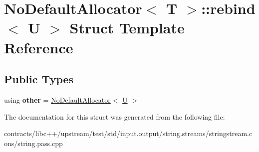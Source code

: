 \hypertarget{struct_no_default_allocator_1_1rebind}{}\section{No\+Default\+Allocator$<$ T $>$\+:\+:rebind$<$ U $>$ Struct Template Reference}
\label{struct_no_default_allocator_1_1rebind}
\subsection*{Public Types}
\begin{DoxyCompactItemize}
\item 
\mbox{\label{struct_no_default_allocator_1_1rebind_aa870ae806507be5bcfce17573c7abf25}} 
using {\bfseries other} = \mbox{\hyperlink{struct_no_default_allocator}{No\+Default\+Allocator}}$<$ \mbox{\hyperlink{union_u}{U}} $>$
\end{DoxyCompactItemize}


The documentation for this struct was generated from the following file\+:\begin{DoxyCompactItemize}
\item 
contracts/libc++/upstream/test/std/input.\+output/string.\+streams/stringstream.\+cons/string.\+pass.\+cpp\end{DoxyCompactItemize}
